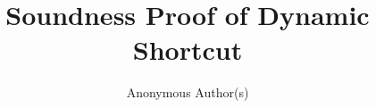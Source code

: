 \documentclass[sigplan,10pt]{acmart}
\begin{document}
\title{Soundness Proof of Dynamic Shortcut}

\author{Anonymous Author(s)}
\date{}

\maketitle



\end{document}
